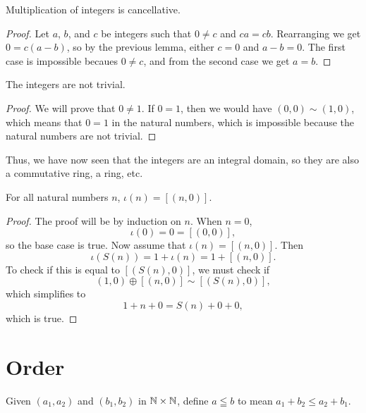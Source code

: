 \documentclass[../../math.tex]{subfiles}
\begin{document}
\begin{instance}
    Multiplication of integers is cancellative.
\end{instance}
\begin{proof}
    Let $a$, $b$, and $c$ be integers such that $0 \neq c$ and $ca = cb$.
    Rearranging we get $0 = c(a - b)$, so by the previous lemma, either $c = 0$
    and $a - b = 0$.  The first case is impossible becaues $0 \neq c$, and from
    the second case we get $a = b$.
\end{proof}

\begin{instance}
    The integers are not trivial.
\end{instance}
\begin{proof}
    We will prove that $0 \neq 1$.  If $0 = 1$, then we would have $(0, 0) \sim
    (1, 0)$, which means that $0 = 1$ in the natural numbers, which is
    impossible because the natural numbers are not trivial.
\end{proof}

Thus, we have now seen that the integers are an integral domain, so they are
also a commutative ring, a ring, etc.

\begin{theorem}
    For all natural numbers $n$, $\iota(n) = [(n, 0)]$.
\end{theorem}
\begin{proof}
    The proof will be by induction on $n$.  When $n = 0$,
    \[
        \iota(0) = 0 = [(0, 0)],
    \]
    so the base case is true.  Now assume that $\iota(n) = [(n, 0)]$.  Then
    \[
        \iota(S(n)) = 1 + \iota(n) = 1 + [(n, 0)].
    \]
    To check if this is equal to $[(S(n), 0)]$, we must check if
    \[
        (1, 0) \oplus [(n, 0)] \sim [(S(n), 0)],
    \]
    which simplifies to
    \[
        1 + n + 0 = S(n) + 0 + 0,
    \]
    which is true.
\end{proof}

\section{Order}

\begin{definition}
    Given $(a_1, a_2)$ and $(b_1, b_2)$ in $\mathbb{N} \times \mathbb{N}$, define $a \leqq b$ to
    mean $a_1 + b_2 \leq a_2 + b_1$.
\end{definition}
\end{document}
